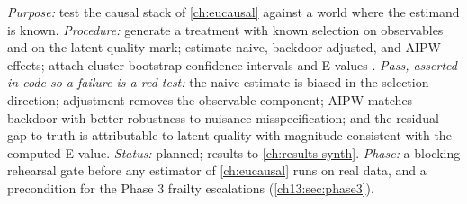 \begin{protocol}
\label{chcp:prot:causal}
\emph{Purpose:} test the causal stack of \cref{ch:eucausal} against a world where the estimand is known.
\emph{Procedure:} generate a treatment with known selection on observables and on the latent quality mark;
estimate naive, backdoor-adjusted, and AIPW effects; attach cluster-bootstrap confidence intervals and
E-values \citep{hernan2020}. \emph{Pass, asserted in code so a failure is a red test:} the naive estimate is
biased in the selection direction; adjustment removes the observable component; AIPW matches backdoor with
better robustness to nuisance misspecification; and the residual gap to truth is attributable to latent
quality with magnitude consistent with the computed E-value. \emph{Status:} planned; results to
\cref{ch:results-synth}. \emph{Phase:} a blocking rehearsal gate before any estimator of \cref{ch:eucausal}
runs on real data, and a precondition for the Phase 3 frailty escalations (\cref{ch13:sec:phase3}).
\end{protocol}

